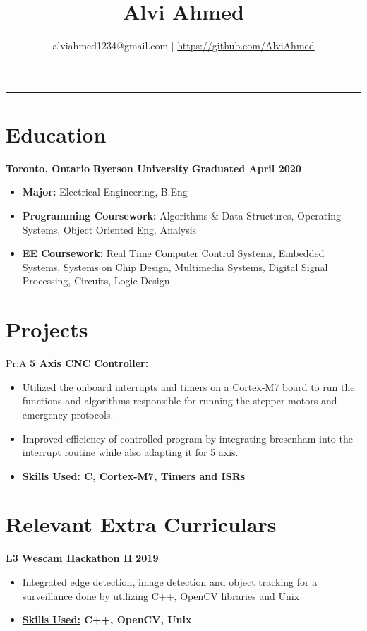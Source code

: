 \documentclass[11pt]{article}
\title{
	Alvi Ahmed
}
\author{alviahmed1234@gmail.com | \underline{\url{https://github.com/AlviAhmed}}}
\newcommand{\spaces}{1em}
\newcommand{\uniname}{Ryerson University}
\newcommand{\unigrad}{Graduated April 2020}
\newcommand{\uniloc}{Toronto, Ontario}
\newcommand{\uni}[3]{
  \begin{flushleft}
    {\small\bfseries #1}
    \hfill
    {\small\bfseries #2}
    \hfill
    {\small\bfseries #3}
\end{flushleft}
  \vspace{-0.7em}
}
\renewcommand{\maketitle}{
    \begin{center}
    \phantom{.} %
    \vspace{-2em}
    	{\Huge\bfseries \thetitle}
    	\vspace{-0.5em}
		\par\noindent\rule{\textwidth}{2pt}
	\end{center} 
	\begin{center} 
		\vspace{-1em}  
		{\small\theauthor}
	\end{center}
}
\begin{document}

\maketitle    

\section*{Education}
	\uni{\uniloc}{\uniname}{\unigrad}
	\begin{itemize}[noitemsep,nolistsep]   
		\item \textbf{Major:} Electrical Engineering, B.Eng
        \item \textbf{Programming Coursework: } Algorithms \& Data Structures,
           Operating Systems, Object Oriented Eng. Analysis 
        \item \textbf{EE Coursework: } Real Time Computer Control Systems,
          Embedded Systems, Systems on Chip Design, Multimedia Systems,
          Digital Signal Processing, Circuits, Logic Design
        \end{itemize}
        \section*{Projects}


  
Pr:A
\textbf{5 Axis CNC Controller: } 
\begin{itemize}[noitemsep,nolistsep]
\item Utilized the onboard interrupts and timers on a Cortex-M7 board to run
  the functions and algorithms responsible for running the stepper motors and emergency protocols.
\item Improved efficiency of controlled program by integrating bresenham into the
  interrupt routine while also adapting it for 5 axis.
\item \textbf{ \underline{Skills Used:} C, Cortex-M7, Timers and ISRs}
\end{itemize}




 
        \section*{Relevant Extra Curriculars}
            \textbf{L3 Wescam Hackathon II}  \hfill \textbf{2019}
            \begin{itemize}[noitemsep,nolistsep]
              \item Integrated edge detection, image detection and object tracking for a
                surveillance done by utilizing C++, OpenCV libraries and Unix
              \item \textbf{\underline{Skills Used:} C++, OpenCV, Unix}
	            \end{itemize}
                    \vspace{\spaces}
            
\end{document}
